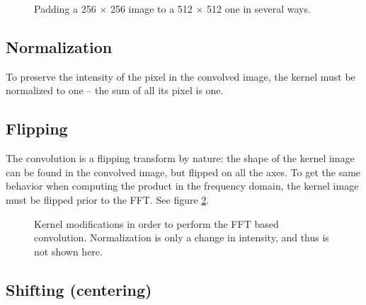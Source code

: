 \documentclass{InsightArticle}
\begin{document}
\begin{figure}[htbp]
\begin{center}
\caption{Padding a 256 $\times$ 256 image to a 512 $\times$ 512 one in several ways.\label{fig:padding}}
\end{center}
\end{figure}


\subsection{Normalization}

To preserve the intensity of the pixel in the convolved image, the kernel must be normalized to one
-- the sum of all its pixel is one.

\subsection{Flipping}

The convolution is a flipping transform by nature: the shape of the kernel image can be found in the
convolved image, but flipped on all the axes. To get the same behavior when computing the product
in the frequency domain, the kernel image must be flipped prior to the FFT. See figure \ref{fig:kernel-modifications}.

\begin{figure}[htbp]
\begin{center}
\caption{Kernel modifications in order to perform the FFT based convolution. Normalization is
only a change in intensity, and thus is not shown here.\label{fig:kernel-modifications}}
\end{center}
\end{figure}

\subsection{Shifting (centering)}
\end{document}
